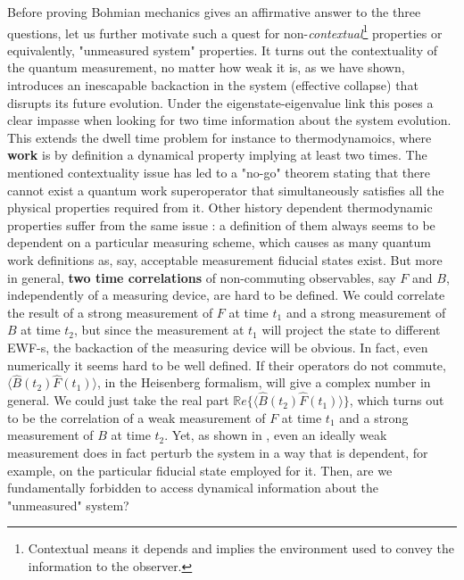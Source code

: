 \documentclass[11pt, a4paper]{article} %
\begin{document}
Before proving Bohmian mechanics gives an affirmative answer to the three questions, let us further motivate such a quest for non-{\em contextual}\footnote{Contextual means it depends and implies the environment used to convey the information to the observer.} properties or equivalently, "unmeasured system" properties. It turns out the contextuality of the quantum measurement, no matter how weak it is, as we have shown, introduces an inescapable backaction in the system (effective collapse) that disrupts its future evolution. Under the eigenstate-eigenvalue link this poses a clear impasse when looking for two time information about the system evolution. This extends the dwell time problem for instance to thermodynamoics, where {\bf work} is by definition a dynamical property implying at least two times. The mentioned contextuality issue has led to a "no-go" theorem \cite{nogo} stating that there cannot exist a quantum work superoperator that simultaneously satisfies all the physical properties required from it. Other history dependent thermodynamic properties suffer from the same issue \cite{workPb1, workPb2}: a definition of them always seems to be dependent on a particular measuring scheme, which causes as many quantum work definitions as, say, acceptable measurement fiducial states exist. But more in general, {\bf two time correlations} of non-commuting observables, say $F$ and $B$, independently of a measuring device, are hard to be defined. We could correlate the result of a strong measurement of $F$ at time $t_1$ and a strong measurement of $B$ at time $t_2$, but since the measurement at $t_1$ will project the state to different EWF-s, the backaction of the measuring device will be obvious. In fact, even numerically it seems hard to be well defined. If their operators do not commute, $\langle \hat{B}(t_2)\hat{F}(t_1)\rangle$, in the Heisenberg formalism, will give a complex number in general. We could just take the real part $\mathbb{R}e \big\{\langle \hat{B}(t_2)\hat{F}(t_1)\rangle\big\}$, which turns out to be the correlation of a weak measurement \cite{Weak} of $F$ at time $t_1$ and a strong measurement of $B$ at time $t_2$. Yet, as shown in \cite{spin}, even an ideally weak measurement does in fact perturb the system in a way that is dependent, for example, on the particular fiducial state employed for it.  Then, are we fundamentally forbidden to access dynamical information about the "unmeasured" system? \vspace{-0.15cm}

\end{document}
